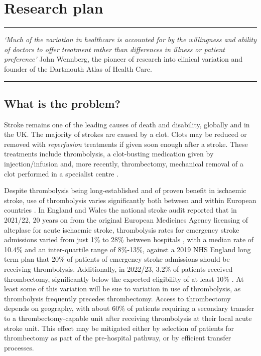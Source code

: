 \section{Research plan}


\vspace{2mm}
\hrule
\textit{`Much of the variation in healthcare is accounted for by the willingness and ability of doctors to offer treatment rather than differences in illness or patient preference'} John Wennberg, the pioneer of research into clinical variation and founder of the Dartmouth Atlas of Health Care.
\vspace{2mm}
\hrule

\subsection{What is the problem?}


Stroke remains one of the leading causes of death and disability, globally and in the UK. The majority of strokes are caused by a clot. Clots may be reduced or removed with \textit{reperfusion} treatments if given soon enough after a stroke. These treatments include thrombolysis, a clot-busting medication given by injection/infusion \cite{emberson_effect_2014} and, more recently, thrombectomy, mechanical removal of a clot performed in a specialist centre \cite{fransen_time_2016}.

Despite thrombolysis being long-established and of proven benefit in ischaemic stroke, use of thrombolysis varies significantly both between and within European countries \cite{aguiar_de_sousa_access_2019}. In England and Wales the national stroke audit reported that in 2021/22, 20 years on from the original European Medicines Agency licensing of alteplase for acute ischaemic stroke, thrombolysis rates for emergency stroke admissions varied from just 1\% to 28\% between hospitals \cite{sentinel_national_stroke_audit_programme_ssnap_2022}, with a median rate of 10.4\% and an inter-quartile range of 8\%-13\%, against a 2019 NHS England long term plan that 20\% of patients of emergency stroke admissions should be receiving thrombolysis. Additionally, in 2022/23, 3.2\% of patients received thrombectomy, significantly below the expected eligibility of at least 10\% \cite{mcmeekin_updating_2021}. At least some of this variation will be sue to variation in use of thrombolysis, as thrombolysis frequently precedes thrombectomy. Access to thrombectomy depends on geography, with about 60\% of patients requiring a secondary transfer to a thrombectomy-capable unit after receiving thrombolysis at their local acute stroke unit. This effect may be mitigated either by selection of patients for thrombectomy as part of the pre-hospital pathway, or by efficient transfer processes.

